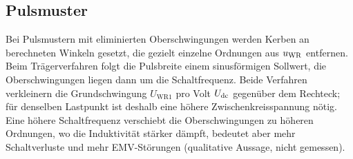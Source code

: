 \subsection{Pulsmuster}

Bei Pulsmustern mit eliminierten Oberschwingungen werden Kerben an berechneten Winkeln gesetzt, die gezielt einzelne Ordnungen aus $u_{\mathrm{WR}}$ entfernen. Beim Trägerverfahren folgt die Pulsbreite einem sinusförmigen Sollwert, die Oberschwingungen liegen dann um die Schaltfrequenz. Beide Verfahren verkleinern die Grundschwingung $U_{\mathrm{WR1}}$ pro Volt $U_{\mathrm{dc}}$ gegenüber dem Rechteck; für denselben Lastpunkt ist deshalb eine höhere Zwischenkreisspannung nötig. Eine höhere Schaltfrequenz verschiebt die Oberschwingungen zu höheren Ordnungen, wo die Induktivität stärker dämpft, bedeutet aber mehr Schaltverluste und mehr EMV-Störungen (qualitative Aussage, nicht gemessen).
